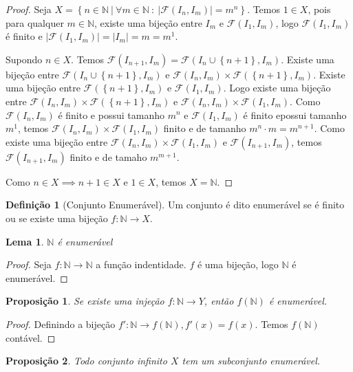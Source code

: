 \documentclass{article}
\newtheorem{prop}{Proposição}[section]
\theoremstyle{theorem}
\theoremstyle{lemma}
\newtheorem{lema}{Lema}
\theoremstyle{definition}
\newtheorem{definicao}{Definição}[section]
\theoremstyle{remark}
\begin{document}
\begin{proof}
	Seja $X = \left\{ n \in \mathbb{N} \: | \: \forall m\in \mathbb{N} \: : \: |\mathcal{F}(I_n, I_m) | = m^n \right\}$.  Temos $1\in X$, pois para qualquer $m\in \mathbb{N}$, existe uma bijeção entre $I_m$ e $\mathcal{F}(I_1, I_m)$, logo $\mathcal{F}(I_1, I_m)$ é finito e  $|\mathcal{F}(I_1, I_m)| = |I_m| = m =  m^1$. 

	Supondo $n\in X$. Temos $\mathcal{F}(I_{n+1}, I_{m} ) = \mathcal{F}(I_n\cup\left\{n+1\right\}, I_m)$. Existe uma bijeção entre $\mathcal{F}(I_n\cup\left\{n+1\right\}, I_m)$ e $\mathcal{F}(I_n, I_m) \times \mathcal{F}(\left\{n+1\right\}, I_m)$. Existe uma bijeção entre  $\mathcal{F}(\left\{n+1\right\}, I_m)$ e  $\mathcal{F}(I_1, I_m)$. Logo  existe uma bijeção entre $\mathcal{F}(I_n, I_m) \times \mathcal{F}(\left\{n+1\right\}, I_m)$ e $\mathcal{F}(I_n, I_m) \times \mathcal{F}(I_1, I_m)$.  Como $\mathcal{F}(I_n, I_m) $ é finito e possui tamanho $m^n$ e $ \mathcal{F}(I_1, I_m)$ é finito epossui tamanho $m^1$, temos $\mathcal{F}(I_n, I_m) \times \mathcal{F}(I_1, I_m)$ finito e de tamanho $m^n\cdot m = m^{n+1}$. Como existe uma bijeção entre $\mathcal{F}(I_n, I_m) \times \mathcal{F}(I_1, I_m)$ e  $\mathcal{F}(I_{n+1}, I_{m} ) $, temos $\mathcal{F}(I_{n+1}, I_{m} ) $ finito e de tamaho $m^{m+1}$.

	Como $n\in X \implies n+1\in X$ e $1\in X$, temos $X = \mathbb{N}$.
\end{proof}
\begin{definicao}[Conjunto Enumerável]
	Um conjunto é dito enumerável se é finito ou se existe uma bijeção $f: \mathbb{N} \to X$.
\end{definicao}
\begin{lema}
	$\mathbb{N}$ é enumerável
\end{lema}
\begin{proof}
	Seja $f: \mathbb{N} \to \mathbb{N}$ a função indentidade. $f$ é uma bijeção, logo $\mathbb{N}$ é enumerável.
\end{proof}
\begin{prop}
	Se existe uma injeção $f: \mathbb{N} \to Y$, então $f(\mathbb{N})$ é enumerável. 
\end{prop}
\begin{proof}
	Definindo a bijeção $f' : \mathbb{N} \to f( \mathbb{N}), f'(x) = f(x)$. Temos $f(\mathbb{N})$ contável.
\end{proof}
\begin{prop}
	Todo conjunto infinito $X$ tem um subconjunto enumerável.
\end{prop}
\end{document}
